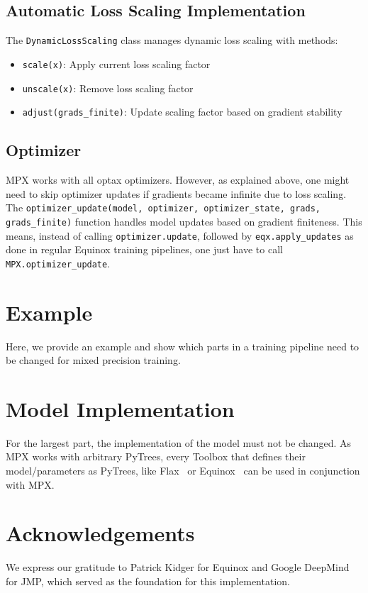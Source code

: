 \documentclass[11pt,a4paper]{article}
\newcommand{\mpx}{\textsc{MPX}}
\begin{document}
\subsection{Automatic Loss Scaling Implementation}
The \texttt{DynamicLossScaling} class manages dynamic loss scaling with methods:
\begin{itemize}
    \item \texttt{scale(x)}: Apply current loss scaling factor
    \item \texttt{unscale(x)}: Remove loss scaling factor
    \item \texttt{adjust(grads\_finite)}: Update scaling factor based on gradient stability
\end{itemize}

\subsection{Optimizer}
\mpx{} works with all optax optimizers. However, as explained above, one might need to skip optimizer updates if gradients became infinite due to loss scaling.
The  \texttt{optimizer\_update(model, optimizer, optimizer\_state, grads, grads\_finite)} function handles model updates based on gradient finiteness.
This means, instead of calling \texttt{optimizer.update}, followed by \texttt{eqx.apply\_updates} as done in regular Equinox training pipelines, one just have to call \texttt{\mpx{}.optimizer\_update}.

\section{Example}
Here, we provide an example and show which parts in a training pipeline need to be changed for mixed precision training.

\section{Model Implementation}
For the largest part, the implementation of the model must not be changed. 
As \mpx{} works with arbitrary PyTrees, every Toolbox that defines their model/parameters as PyTrees, like Flax~\cite{flax2020github} or Equinox~\cite{kidger2021equinox} can be used in conjunction with \mpx{}. 

\section{Acknowledgements}
We express our gratitude to Patrick Kidger for Equinox and Google DeepMind for JMP, which served as the foundation for this implementation.
\end{document}
